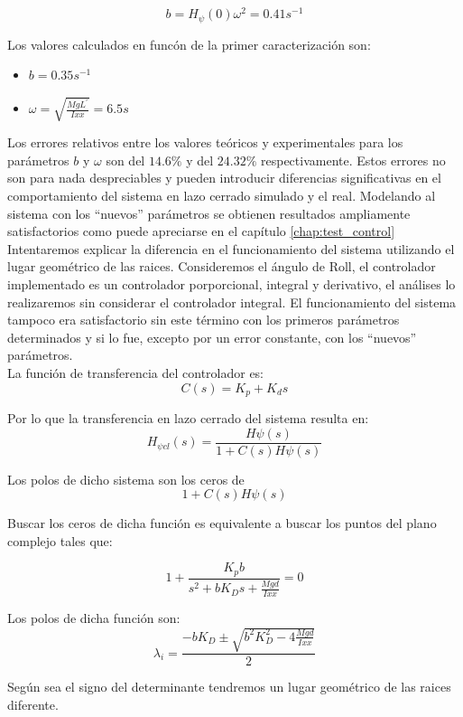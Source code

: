 \documentclass[main]{subfiles}
\begin{document}
\begin{equation}
b = H_{\psi}(0)\omega^2 = 0.41 s^{-1}
\end{equation}

Los valores calculados en func\'on de la primer caracterizaci\'on son:
\begin{itemize}
	\item $b = 0.35 s^{-1}$
	\item $\omega = \sqrt{\frac{MgL^\prime}{Ixx}} = 6.5s$
\end{itemize}

Los errores relativos entre los valores te\'oricos y experimentales para los par\'ametros $b$ y $\omega$ son del $14.6\%$ y del $24.32\%$ respectivamente. Estos errores no son para nada despreciables y pueden introducir diferencias significativas en el comportamiento del sistema en lazo cerrado simulado y el real. Modelando al sistema con los ``nuevos'' par\'ametros se obtienen resultados ampliamente satisfactorios como puede apreciarse en el cap\'itulo \ref{chap:test_control}\\

Intentaremos explicar la diferencia en el funcionamiento del sistema utilizando el lugar geom\'etrico de las raices. Consideremos el \'angulo de Roll, el controlador implementado es un controlador porporcional, integral y derivativo, el an\'alises lo realizaremos sin considerar el controlador integral. El funcionamiento del sistema tampoco era satisfactorio sin este t\'ermino con los primeros par\'ametros determinados y si lo fue, excepto por un error constante, con los ``nuevos'' par\'ametros.\\

La funci\'on de transferencia del controlador es:
\begin{equation}
C(s) = K_p+K_ds
\end{equation}
  
Por lo que la transferencia en lazo cerrado del sistema resulta en:
\begin{equation}
H_{\psi cl} (s)= \frac{H{\psi}(s)}{1+C(s)H{\psi}(s)}
\end{equation}

Los polos de dicho sistema son los ceros de \begin{equation}
1+C(s)H{\psi}(s)
\end{equation}

Buscar los ceros de dicha funci\'on es equivalente a buscar los puntos del plano complejo tales que:

\begin{equation}
1+\frac{K_pb}{s^2+bK_Ds+\frac{Mgd}{Ixx}} = 0
\end{equation}

Los polos de dicha funci\'on son:
\begin{equation}
\lambda_i = \frac{-bK_D \pm \sqrt{b^2K_D^2-4\frac{Mgd}{Ixx}}}{2}
\end{equation}

Seg\'un sea el signo del determinante tendremos un lugar geom\'etrico de las raices diferente. 
\end{document}
